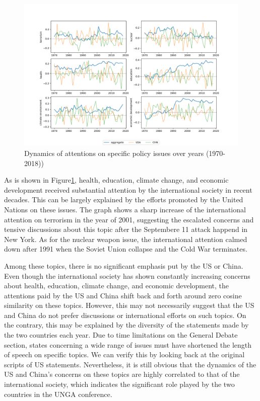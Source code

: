 \documentclass[final,authoryear,3p,12pt,times,hidelinks]{elsarticle}
\begin{document}
\begin{figure}[ht!]
  \begin{center}
    \includegraphics[width=1\textwidth]{graphs/dynamics_attention_on_topics.png}
    \caption{Dynamics of attentions on specific policy issues over years (1970-2018))}
    \label{fig:dynamic attention}
  \end{center}
\end{figure}

As is shown in Figure\ref{fig:dynamic attention}, health, education, climate change, and economic development received substantial attention by the international society in recent decades. This can be largely explained by the efforts promoted by the United Nations on these issues. The graph shows a sharp increase of the international attention on terrorism in the year of 2001, suggesting the escalated concerns and tensive discussions about this topic after the Septembere 11 attack happend in New York. As for the nuclear weapon issue, the international attention calmed down after 1991 when the Soviet Union collapse and the Cold War terminates. 

Among these topics, there is no significant emphasis put by the US or China. Even though the international society has shown constantly increasing concerns about health, education, climate change, and economic development, the attentions paid by the US and China shift back and forth around zero cosine similarity on these topics. However, this may not necessarily suggest that the US and China do not prefer discussions or international efforts on such topics. On the contrary, this may be explained by the diversity of the statements made by the two countries each year. Due to time limitations on the General Debate section, states concerning a wide range of issues must have shortened the length of speech on specific topics. We can verify this by looking back at the original scripts of US statements. Nevertheless, it is still obvious that the dynamics of the US and China's concerns on these topics are highly correlated to that of the international society, which indicates the significant role played by the two countries in the UNGA conference. 
\end{document}

